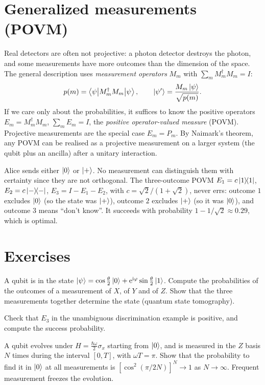 \section{Generalized measurements (POVM)\starred}\label{sec:povm}
Real detectors are often not projective: a photon detector destroys the photon, and some measurements have more outcomes than the dimension of
the space. The general description uses \emph{measurement operators} $M_m$ with $\sum_mM_m^\dagger M_m=I$:
\begin{equation}
  p(m)=\left\langle\psi\middle|M_m^\dagger M_m\middle|\psi\right\rangle,\qquad\left|\psi'\right\rangle=\frac{M_m\left|\psi\right\rangle}{\sqrt{p(m)}}.
\end{equation}
If we care only about the probabilities, it suffices to know the positive operators $E_m=M_m^\dagger M_m$, $\sum_mE_m=I$, the
\emph{positive operator-valued measure} (POVM). Projective measurements are the special case $E_m=P_m$. By Naimark's theorem, any POVM can be
realised as a projective measurement on a larger system (the qubit plus an ancilla) after a unitary interaction.

\begin{example}
Alice sends either $\left|0\right\rangle$ or $\left|+\right\rangle$. No measurement can distinguish them with certainty since they are not orthogonal. The three-outcome POVM
$E_1=c\left|1\middle\rangle\!\middle\langle1\right|$, $E_2=c\left|-\middle\rangle\!\middle\langle-\right|$, $E_3=I-E_1-E_2$, with $c=\sqrt2/(1+\sqrt2)$, never errs: outcome $1$ excludes $\left|0\right\rangle$ (so the state was $\left|+\right\rangle$),
outcome $2$ excludes $\left|+\right\rangle$ (so it was $\left|0\right\rangle$), and outcome $3$ means ``don't know''. It succeeds with probability $1-1/\sqrt2\approx0.29$, which
is optimal.
\end{example}

\section{Exercises}
\begin{exercise}
A qubit is in the state $\left|\psi\right\rangle=\cos\frac\theta2\left|0\right\rangle+\mathrm e^{\mathrm i\varphi}\sin\frac\theta2\left|1\right\rangle$. Compute the probabilities of the outcomes of
a measurement of $X$, of $Y$ and of $Z$. Show that the three measurements together determine the state (quantum state tomography).
\end{exercise}
\begin{exercise}
Check that $E_3$ in the unambiguous discrimination example is positive, and compute the success probability.
\end{exercise}
\begin{exercise}
A qubit evolves under $H=\frac{\hbar\omega}2\sigma_x$ starting from $\left|0\right\rangle$, and is measured in the $Z$ basis $N$ times during the interval
$[0,T]$, with $\omega T=\pi$. Show that the probability to find it in $\left|0\right\rangle$ at all measurements is $[\cos^2(\pi/2N)]^N\to1$ as $N\to\infty$.
Frequent measurement freezes the evolution.
\end{exercise}
